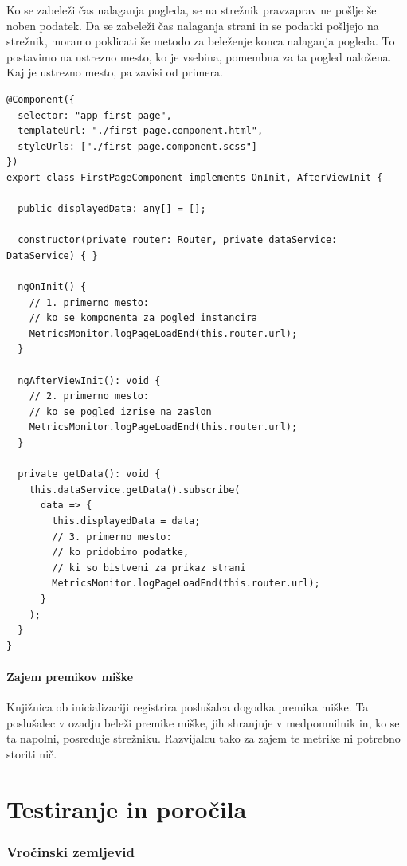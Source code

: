 \documentclass[a4paper, 12pt]{book}
\begin{document}
Ko se zabeleži čas nalaganja pogleda, se na strežnik pravzaprav ne pošlje še noben podatek. Da se zabeleži čas nalaganja strani in se podatki pošljejo na strežnik, moramo poklicati še metodo za beleženje konca nalaganja pogleda. To postavimo na ustrezno mesto, ko je vsebina, pomembna za ta pogled naložena. Kaj je ustrezno mesto, pa zavisi od primera.

\begin{lstlisting}[label=lib_page_comp, caption=Zajem časa nalaganja pogleda]
@Component({
  selector: "app-first-page",
  templateUrl: "./first-page.component.html",
  styleUrls: ["./first-page.component.scss"]
})
export class FirstPageComponent implements OnInit, AfterViewInit {

  public displayedData: any[] = [];

  constructor(private router: Router, private dataService: DataService) { }

  ngOnInit() {
    // 1. primerno mesto:
    // ko se komponenta za pogled instancira
    MetricsMonitor.logPageLoadEnd(this.router.url);
  }

  ngAfterViewInit(): void {
    // 2. primerno mesto:
    // ko se pogled izrise na zaslon
    MetricsMonitor.logPageLoadEnd(this.router.url);
  }

  private getData(): void {
    this.dataService.getData().subscribe(
      data => {
        this.displayedData = data;
        // 3. primerno mesto:
        // ko pridobimo podatke,
        // ki so bistveni za prikaz strani
        MetricsMonitor.logPageLoadEnd(this.router.url);
      }
    );
  }
}
\end{lstlisting}

\paragraph{Zajem premikov miške}

Knjižnica ob inicializaciji registrira poslušalca dogodka premika miške. Ta poslušalec v ozadju beleži premike miške, jih shranjuje v medpomnilnik in, ko se ta napolni, posreduje strežniku. Razvijalcu tako za zajem te metrike ni potrebno storiti nič.

\section{Testiranje in poročila}
\label{ch3:sec4}

\subsubsection{Vročinski zemljevid}
\end{document}
